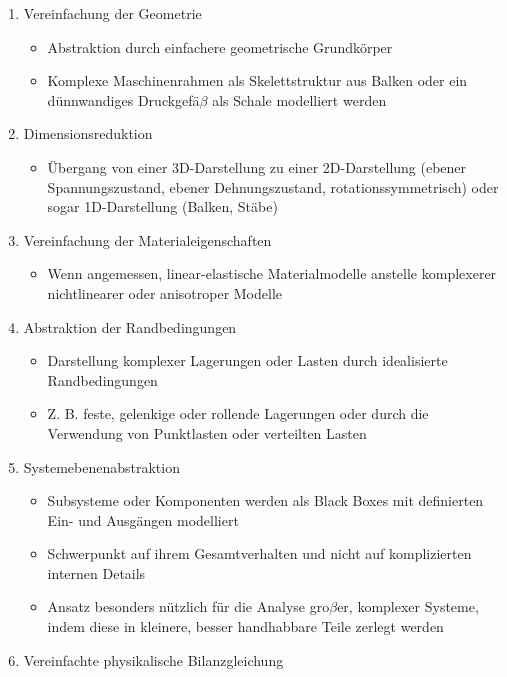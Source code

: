 \begin{enumerate}
\item Vereinfachung der Geometrie

\begin{itemize}
\item Abstraktion durch einfachere geometrische Grundkörper
\item Komplexe Maschinenrahmen als Skelettstruktur aus Balken oder ein dünnwandiges Druckgefä$\beta$ als Schale modelliert werden
\end{itemize}


\item Dimensionsreduktion

\begin{itemize}
\item Übergang von einer 3D-Darstellung zu einer 2D-Darstellung (ebener Spannungszustand, ebener Dehnungszustand, rotationssymmetrisch) oder sogar 1D-Darstellung (Balken, Stäbe)
\end{itemize}


\item Vereinfachung der Materialeigenschaften

\begin{itemize}
\item Wenn angemessen, linear-elastische Materialmodelle anstelle komplexerer nichtlinearer oder anisotroper Modelle
\end{itemize}


\item Abstraktion der Randbedingungen

\begin{itemize}
\item Darstellung komplexer Lagerungen oder Lasten durch idealisierte Randbedingungen
\item Z. B. feste, gelenkige oder rollende Lagerungen oder durch die Verwendung von Punktlasten oder verteilten Lasten
\end{itemize}


\item Systemebenenabstraktion

\begin{itemize}
\item Subsysteme oder Komponenten werden als Black Boxes mit definierten Ein- und Ausgängen modelliert
\item Schwerpunkt auf ihrem Gesamtverhalten und nicht auf komplizierten internen Details
\item Ansatz besonders nützlich für die Analyse gro$\beta$er, komplexer Systeme, indem diese in kleinere, besser handhabbare Teile zerlegt werden
\end{itemize}


\item Vereinfachte physikalische Bilanzgleichung
\end{enumerate}

